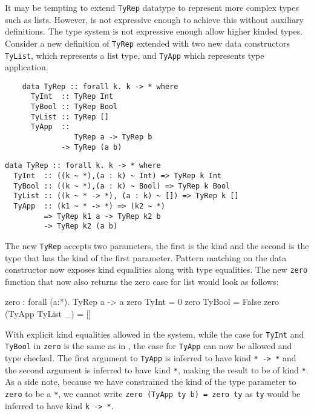 \documentclass[manuscript,screen,nonacm]{acmart}
\begin{document}
It may be tempting to extend \lstinline{TyRep} datatype to represent more complex types such as lists. However, \SFC is not expressive enough to achieve this without auxiliary definitions. The type system is not expressive enough allow higher kinded types. Consider a new definition of \lstinline{TyRep} extended with two new data constructors \lstinline{TyList}, which represents a list type, and \lstinline{TyApp} which represents type application.

\begin{minipage}[ht]{0.4\linewidth}
  \begin{lstlisting}
    data TyRep :: forall k. k -> * where
      TyInt  :: TyRep Int
      TyBool :: TyRep Bool
      TyList :: TyRep []      
      TyApp  ::
                TyRep a -> TyRep b
             -> TyRep (a b)
  \end{lstlisting}
\end{minipage}%
\begin{minipage}[ht]{0.5\linewidth}
  \begin{lstlisting}
data TyRep :: forall k. k -> * where
  TyInt  :: ((k ~ *),(a : k) ~ Int) => TyRep k Int
  TyBool :: ((k ~ *),(a : k) ~ Bool) => TyRep k Bool
  TyList :: ((k ~ * -> *), (a : k) ~ []) => TyRep k []      
  TyApp  :: (k1 ~ * -> *) => (k2 ~ *)
         => TyRep k1 a -> TyRep k2 b
         -> TyRep k2 (a b)
  \end{lstlisting}
\end{minipage}

The new \lstinline{TyRep} accepts two parameters, the first is the kind and the second is the type that has the kind of the first parameter. Pattern matching on the data constructor now exposes kind equalities along with type equalities. The new \lstinline{zero} function that now also returns the zero case for list would look as follows:
\begin{codef}
  zero : forall (a:*). TyRep a -> a
  zero TyInt            = 0
  zero TyBool           = False
  zero (TyApp TyList _) = []
\end{codef}

With explicit kind equalities allowed in the system, while the case for \lstinline{TyInt} and \lstinline{TyBool} in \lstinline{zero} is the same as in \SFC, the case for \lstinline{TyApp} can now be allowed and type checked. The first argument to \lstinline{TyApp} is inferred to have kind \lstinline{* -> *} and the second argument is inferred to have kind \lstinline{*}, making the result to be of kind \lstinline{*}. As a side note, because we have constrained the kind of the type parameter to \lstinline{zero} to be a \lstinline{*}, we cannot write \lstinline{zero (TyApp ty b) = zero ty} as \lstinline{ty} would be inferred to have kind \lstinline{k -> *}.
\end{document}
